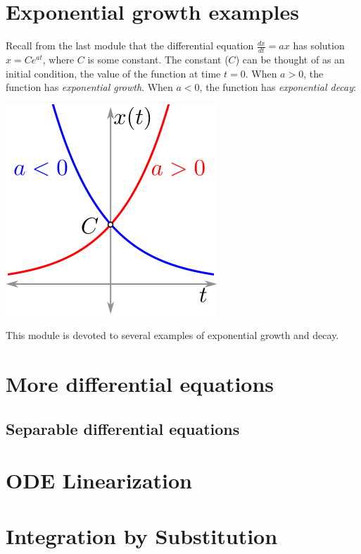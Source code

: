\documentclass[twoside,openright,titlepage,a4paper]{book}
\begin{document}
\begin{sloppypar}
\section{Exponential growth examples} \label{ChIntegrationSecExponentialGrowthExamples}

Recall from the last module that the differential equation $\frac{dx}{dt} = ax$ has solution $x = Ce^{at}$, where $C$ is some constant. The constant ($C$) can be thought of as an initial condition, the value of the function at time $t=0$. When $a>0$, the function has \textit{exponential growth}. When $a<0$, the function has \textit{exponential decay}:
\begin{center}\includegraphics[scale=0.6]{ExponentialGrowthDecay}\end{center}

This module is devoted to several examples of exponential growth and decay.


\section{More differential equations} \label{ChIntegrationSecMoreDifferentialEquations}
\subsection{Separable differential equations} \label{ChIntegrationSecMoreDifferentialEquationsSubsecSeparableDifferentialEquations}
\section{ODE Linearization} \label{ChIntegrationSecODELinearization}
\section{Integration by Substitution} \label{ChIntegrationSecIntegrationBySubstitution}

\end{sloppypar}
\end{document}
